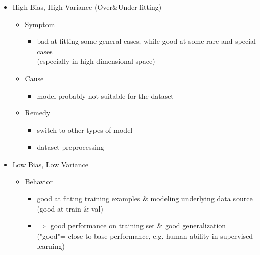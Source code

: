 \begin{itemize}
\begin{itemize}
	\end{itemize}
\item High Bias, High Variance (Over\&Under-fitting)
	\begin{itemize}
	\item Symptom
		\begin{itemize}
		\item bad at fitting some general cases; while good at some rare and special cases \\
		(especially in high dimensional space)
		\end{itemize}
	\item Cause
		\begin{itemize}
		\item model probably not suitable for the dataset
		\end{itemize}
	\item Remedy
		\begin{itemize}
		\item switch to other types of model
		\item dataset preprocessing
		\end{itemize}
	\end{itemize}
\item Low Bias, Low Variance
	\begin{itemize}
	\item Behavior
		\begin{itemize}
		\item good at fitting training examples \& modeling underlying data source \\ 
		(good at train \& val)
		\item $\Rightarrow$ good performance on training set \& good generalization \\
		("good"= close to base performance, e.g. human ability in supervised learning)
		\end{itemize}
	\end{itemize}
\end{itemize}

